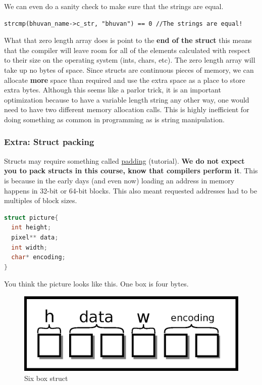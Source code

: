 We can even do a sanity check to make sure that the strings are equal.

\begin{verbatim}
strcmp(bhuvan_name->c_str, "bhuvan") == 0 //The strings are equal!
\end{verbatim}

What that zero length array does is point to the \textbf{end of the struct} this means that the compiler will leave room for all of the elements calculated with respect to their size on the operating system (ints, chars, etc).
The zero length array will take up no bytes of space.
Since structs are continuous pieces of memory, we can allocate \textbf{more} space than required and use the extra space as a place to store extra bytes.
Although this seems like a parlor trick, it is an important optimization because to have a variable length string any other way, one would need to have two different memory allocation calls.
This is highly inefficient for doing something as common in programming as is string manipulation.

\subsubsection{Extra: Struct packing}

Structs may require something called \href{http://www.catb.org/esr/structure-packing/}{padding} (tutorial).
\textbf{We do not expect you to pack structs in this course, know that compilers perform it}.
This is because in the early days (and even now) loading an address in memory happens in 32-bit or 64-bit blocks.
This also meant requested addresses had to be multiples of block sizes.

\begin{lstlisting}[language=C]
struct picture{
  int height;
  pixel** data;
  int width;
  char* encoding;
}
\end{lstlisting}

You think the picture looks like this.
One box is four bytes.

\begin{figure}[H]
\centering
\includegraphics[width=.7\textwidth]{introc/drawings/struct_clean.eps}
\caption{Six box struct}
\label{fig:clean_struct}
\end{figure}

